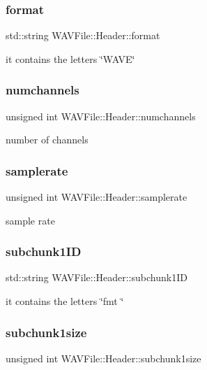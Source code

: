 \subsubsection{format}
{\footnotesize\ttfamily std\+::string W\+A\+V\+File\+::\+Header\+::format}

it contains the letters \char`\"{}\+W\+A\+V\+E\char`\"{} \mbox{\label{struct_w_a_v_file_1_1_header_a1636a3deffe4e61b7ab8e8b8168a7b18}} 
\subsubsection{numchannels}
{\footnotesize\ttfamily unsigned int W\+A\+V\+File\+::\+Header\+::numchannels}

number of channels \mbox{\label{struct_w_a_v_file_1_1_header_a271b0090295f7276b1d91683bc2a0f74}} 
\subsubsection{samplerate}
{\footnotesize\ttfamily unsigned int W\+A\+V\+File\+::\+Header\+::samplerate}

sample rate \mbox{\label{struct_w_a_v_file_1_1_header_ae52803bdbed54de73d48d2c0bf45099d}} 
\subsubsection{subchunk1\+ID}
{\footnotesize\ttfamily std\+::string W\+A\+V\+File\+::\+Header\+::subchunk1\+ID}

it contains the letters \char`\"{}fmt \char`\"{} \mbox{\label{struct_w_a_v_file_1_1_header_ae4e68dc34f2431942bbe6a5586a3ec55}} 
\subsubsection{subchunk1size}
{\footnotesize\ttfamily unsigned int W\+A\+V\+File\+::\+Header\+::subchunk1size}

